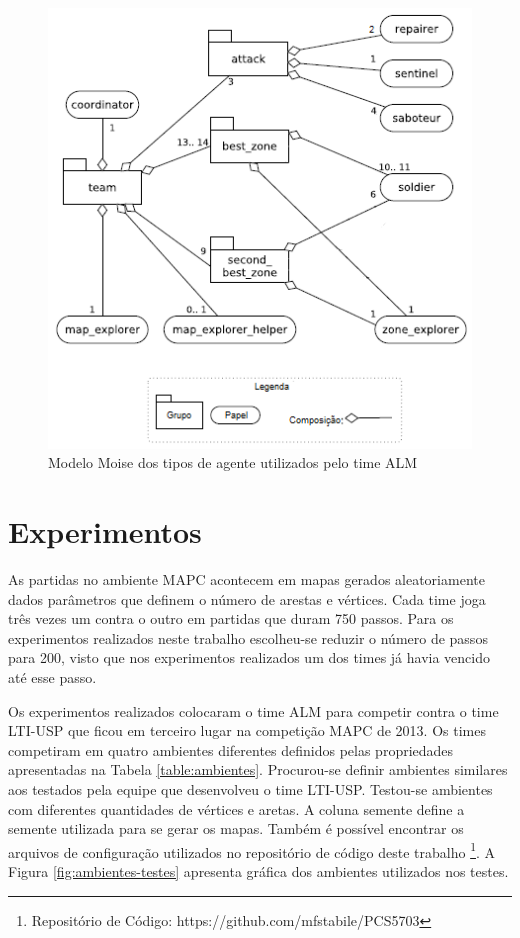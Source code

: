 \documentclass{llncs}
\begin{document}
\begin{figure}[!ht]
\centering
\includegraphics[width=0.7\linewidth]{./images/fig2.png}
\caption{Modelo Moise dos tipos de agente utilizados pelo time ALM}
\label{fig:fig2}
\end{figure}

\section{Experimentos}

As partidas no ambiente MAPC acontecem em mapas gerados aleatoriamente dados parâmetros que definem o número de arestas e vértices. Cada time joga três vezes um contra o outro em partidas que duram 750 passos. Para os experimentos realizados neste trabalho escolheu-se reduzir o número de passos para 200, visto que nos experimentos realizados um dos times já havia vencido até esse passo.

Os experimentos realizados colocaram o time ALM para competir contra o time LTI-USP que ficou em terceiro lugar na competição MAPC de 2013. Os times competiram em quatro ambientes diferentes definidos pelas propriedades apresentadas na Tabela \ref{table:ambientes}. Procurou-se definir ambientes similares aos testados pela equipe que desenvolveu o time LTI-USP. Testou-se ambientes com diferentes quantidades de vértices e aretas. A coluna semente define a semente utilizada para se gerar os mapas. Também é possível encontrar os arquivos de configuração utilizados no repositório de código deste trabalho \footnote{Repositório de Código: https://github.com/mfstabile/PCS5703}. A Figura \ref{fig:ambientes-testes} apresenta gráfica dos ambientes utilizados nos testes.
\end{document}
